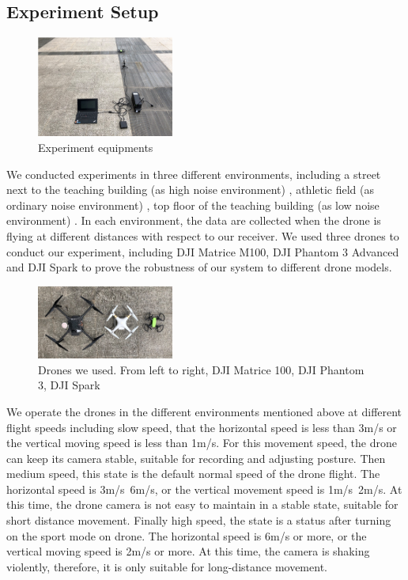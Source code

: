 \documentclass{sig-alternate-10pt}
\begin{document}
\subsection{Experiment Setup}
\begin{figure}[!h]
	\centering
	\includegraphics[width=0.4\textwidth]{pics/exp.png}
	\caption{Experiment equipments}
	\label{exp}
\end{figure}

We conducted experiments in three different environments, including a street next to the teaching building (as high noise environment) , athletic field (as ordinary noise environment) , top floor of the teaching building (as low noise environment) . In each environment, the data are collected when the drone is flying at different distances with respect to our receiver. We used three drones to conduct our experiment, including DJI Matrice M100, DJI Phantom 3 Advanced and DJI Spark to prove the robustness of our system to different drone models. 



\begin{figure}[!h]
	\centering
	\includegraphics[width=0.4\textwidth]{pics/drones.png}
	\caption{Drones we used. From left to right, DJI Matrice 100, DJI Phantom 3, DJI Spark}
	\label{drones}
\end{figure}


\hspace{1mm} 
We operate the drones in the different environments mentioned above at different flight speeds including slow speed, that the horizontal speed is less than 3m/s or the vertical moving speed is less than 1m/s. For this movement speed, the drone can keep its camera stable, suitable for recording and adjusting posture. Then medium speed, this state is the default normal speed of the drone flight. The horizontal speed is 3m/s~6m/s, or the vertical movement speed is 1m/s~2m/s. At this time, the drone camera is not easy to maintain in a stable state, suitable for short distance movement. Finally high speed, the state is a status after turning on the sport mode on drone. The horizontal speed is 6m/s or more, or the vertical moving speed is 2m/s or more. At this time, the camera is shaking violently, therefore, it is only suitable for long-distance movement.
\end{document}
